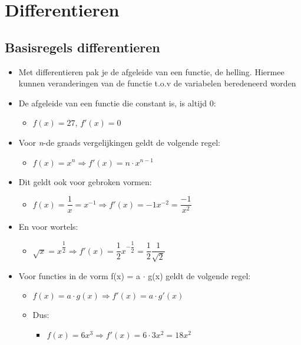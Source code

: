 \documentclass[11pt]{article}
\date{\today}
\title{}
\begin{document}
\tableofcontents

\pagebreak
\section{Differentieren}
\label{sec:orgf05348e}

\subsection{Basisregels differentieren}
\label{sec:orgad9aec7}
\begin{itemize}
\item Met differentieren pak je de afgeleide van een functie, de helling. Hiermee kunnen veranderingen van de functie t.o.v de variabelen beredeneerd worden
\item De afgeleide van een functie die constant is, is altijd 0:
\begin{itemize}
\item \(f(x) = 27\), \(f'(x) = 0\)
\end{itemize}
\item Voor \textit{n}-de graads vergelijkingen geldt de volgende regel:
\begin{itemize}
\item \(f(x) = x^{n} \Rightarrow f'(x) = n \cdot x^{n-1}\)
\end{itemize}
\item Dit geldt ook voor gebroken vormen:
\begin{itemize}
\item \(f(x) = \dfrac{1}{x} = x^{-1} \Rightarrow f'(x) = -1x^{-2} = \dfrac{-1}{x^{2}}\)
\end{itemize}
\item En voor wortels:
\begin{itemize}
\item \(\sqrt{x} = x^{\dfrac{1}{2}} \Rightarrow f'(x) = \dfrac{1}{2}x^{-\dfrac{1}{2}} = \dfrac{1}{2}\dfrac{1}{\sqrt{2}}\)
\end{itemize}
\item Voor functies in de vorm f(x) = a \(\cdot\) g(x) geldt de volgende regel:
\begin{itemize}
\item \(f(x) = a \cdot g(x) \Rightarrow f'(x) = a \cdot g'(x)\)
\item Dus:
\begin{itemize}
\item \(f(x) = 6x^{3} \Rightarrow f'(x) = 6 \cdot 3x^{2} = 18x^{2}\)
\end{itemize}
\end{itemize}
\end{itemize}
\end{document}
